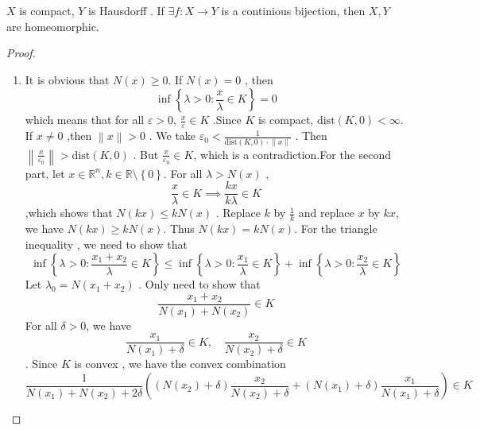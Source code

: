 \documentclass[../main.tex]{subfiles}
\begin{document}
\begin{lemma}{}{}
    \(  X   \) is compact, \(  Y   \) is Hausdorff   . If \(  \exists f :X\to Y  \) is a continious bijection, then \(  X,Y  \) are homeomorphic.   
\end{lemma}
\begin{proof}
    \begin{enumerate}
        \item It is obvious that \(  N\left( x \right)\ge 0   \).  If \(  N\left( x \right)= 0   \) , then \[
        \inf \left\{  \lambda > 0: \frac{x }{ \lambda  }\in K  \right\}= 0
        \]   which means that for all  \(   \varepsilon > 0  \),   \(  \frac{x }{  \varepsilon   } \in K   \) .Since \(  K  \) is compact, \(  \mathrm{dist}\left( K,0 \right)< \infty   \).      If \(  x \neq 0  \) ,then \(  \left\| x \right\|> 0  \) . We take   \(   \varepsilon _0   < \frac{1 }{\mathrm{dist}\left( K,0 \right) \cdot \left\| x \right\| } \) . Then \(  \left\| \frac{x }{ \varepsilon _0  }  \right\|>   \mathrm{dist}\left( K,0 \right) \)    . But \(  \frac{x }{  \varepsilon _0  }    \in K\), which is a contradiction.For the second part, let \(  x \in \mathbb{R} ^{n}, k \in \mathbb{R} \setminus \left\{ 0 \right\}  \). For all \(   \lambda > N\left( x \right)   \) ,  \[
        \frac{x }{ \lambda  }\in K \implies  \frac{kx }{k \lambda  } \in K  
        \]  ,which shows that \(  N\left( kx \right)\le kN\left( x \right)    \)    .  Replace \(  k   \) by \(  \frac{1 }{ k}   \) and replace \(  x  \) by \(  kx  \), we have \(  N\left( kx \right)\ge kN\left( x \right)    \). Thus \(  N\left( kx \right)= kN\left( x \right)    \).       For the triangle inequality , we need to show that \[
       \inf \left\{  \lambda > 0:\frac{x_1+ x_2 }{ \lambda  }\in K  \right\} \le \inf \left\{  \lambda > 0: \frac{x_1 }{ \lambda  }\in K  \right\}+ \inf \left\{  \lambda > 0: \frac{x_2 }{ \lambda  }  \in K\right\}
        \] Let \(   \lambda _0 = N\left( x_1+ x_2 \right)   \) .  Only need to show that \[
        \frac{x_1+ x_2 }{N\left( x_1 \right)+ N\left( x_2 \right)   } \in K 
        \]For all \(   \delta > 0  \), we have  \[
        \frac{x_1 }{N\left( x_1 \right)+  \delta   }\in K,\quad \frac{x_2 }{N\left( x_2 \right)+  \delta   }  \in K
        \]. Since \(  K  \) is convex , we have the convex combination \[
        \frac{1 }{N\left( x_1 \right)+ N\left( x_2 \right)+ 2 \delta    } \left( \left( N\left( x_2 \right)+  \delta   \right)\frac{x_2 }{N\left( x_2 \right)+  \delta   }+ \left( N\left( x_1 \right)+  \delta   \right)\frac{x_1 }{N\left( x_1 \right)+  \delta   }     \right) \in K 
\]
\end{enumerate}
\end{proof}
\end{document}

